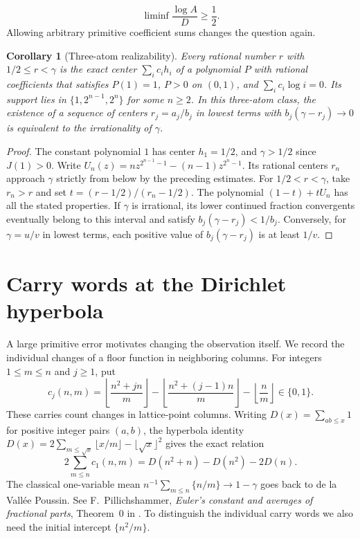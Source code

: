 \documentclass[11pt,a4paper,oneside,openany]{report}
\newtheorem{corollary}[theorem]{Corollary}
\theoremstyle{remark}\newtheorem{remark}[theorem]{Remark}
\numberwithin{equation}{section}
\begin{document}
\[
 \liminf\frac{\log A}{D}\ge\frac12 .
\]
Allowing arbitrary primitive coefficient sums changes the question again.
\begin{corollary}[Three-atom realizability]\label{ch4:st:three-dyadic}
Every rational number $r$ with $1/2\le r<\gamma$ is the exact center
$\sum_i c_i h_i$ of a polynomial $P$ with rational coefficients that
satisfies $P(1)=1$, $P>0$ on $(0,1)$, and $\sum_i c_i\log i=0$.
Its support lies in $\{1,2^{n-1},2^n\}$ for some $n\ge2$.
In this three-atom class, the existence of a sequence of centers
$r_j=a_j/b_j$ in lowest terms with $b_j(\gamma-r_j)\to0$ is
equivalent to the irrationality of $\gamma$.
\end{corollary}
\begin{proof}
The constant polynomial $1$ has center $h_1=1/2$, and $\gamma>1/2$
since $J(1)>0$. Write $U_n(z)=nz^{2^{n-1}-1}-(n-1)z^{2^n-1}$.
Its rational centers $r_n$ approach $\gamma$ strictly from below by
the preceding estimates. For $1/2<r<\gamma$, take $r_n>r$ and set
$t=(r-1/2)/(r_n-1/2)$. The polynomial $(1-t)+tU_n$ has all the
stated properties. If $\gamma$ is irrational, its lower continued
fraction convergents eventually belong to this interval and satisfy
$b_j(\gamma-r_j)<1/b_j$. Conversely, for $\gamma=u/v$ in lowest
terms, each positive value of $b_j(\gamma-r_j)$ is at least $1/v$.
\end{proof}
\section{Carry words at the Dirichlet hyperbola}\label{ch4:sec:carry}
A large primitive error motivates changing the observation itself. We record the individual changes of a floor function in neighboring columns.
For integers $1\le m\le n$ and $j\ge1$, put
\[
 c_j(n,m)=\left\lfloor\frac{n^2+jn}{m}\right\rfloor
 -\left\lfloor\frac{n^2+(j-1)n}{m}\right\rfloor
 -\left\lfloor\frac nm\right\rfloor\in\{0,1\}.
\]
These carries count changes in lattice-point columns. Writing
$D(x)=\sum_{ab\le x}1$ for positive integer pairs $(a,b)$, the hyperbola
identity $D(x)=2\sum_{m\le\sqrt x}\lfloor x/m\rfloor-\lfloor\sqrt x\rfloor^2$
gives the exact relation
\[
 2\sum_{m\le n}c_1(n,m)=D(n^2+n)-D(n^2)-2D(n).
\]
The classical one-variable mean $n^{-1}\sum_{m\le n}\{n/m\}\to1-\gamma$
goes back to de la Vall\'ee Poussin. See F.~Pillichshammer, \emph{Euler's
constant and averages of fractional parts}, Theorem~0 in \cite{pill}. To distinguish the
individual carry words we also need the initial intercept $\{n^2/m\}$.
\end{document}
